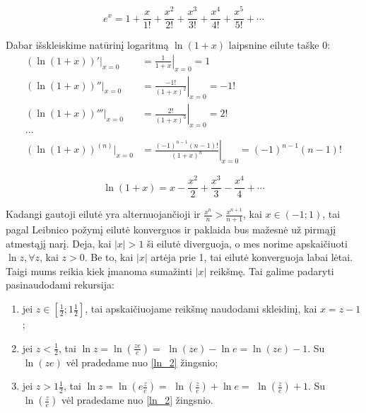 \begin{equation}
  e^{x} = 1 + \frac{x}{1!} + \frac{x^2}{2!} + \frac{x^3}{3!} +%
    \frac{x^4}{4!} + \frac{x^5}{5!} + \cdots
  \label{e_1}
\end{equation}


Dabar išskleiskime natūrinį logaritmą $\ln (1+x)$ laipsnine eilute 
taške $0$:
\begin{align*}
  (\ln (1 + x))'|_{x=0} &= \left. \frac{1}{1+x} \right|_{x=0} = 1 \\
  (\ln (1 + x))''|_{x=0} &= \left. \frac{-1!}{(1+x)^{2}} \right|_{x=0} %
    = -1! \\
  (\ln (1 + x))'''|_{x=0} &= \left. \frac{2!}{(1+x)^{3}} \right|_{x=0} %
    = 2! \\
  \cdots \\
  (\ln (1 + x))^{(n)}|_{x=0} &= %
    \left. \frac{(-1)^{n-1}(n-1)!}{(1+x)^{n}} \right|_{x=0} = %
    (-1)^{n-1}(n-1)!
\end{align*}

\begin{equation}
  \ln (1 + x) = x - \frac{x^2}{2} + \frac{x^3}{3} - \frac{x^4}{4} + \cdots
  \label{ln_1}
\end{equation}

Kadangi gautoji eilutė yra alternuojančioji ir 
$\frac{x^n}{n} > \frac{x^{n+1}}{n+1}$, kai $x \in (-1; 1)$, tai pagal 
Leibnico požymį eilutė konverguos ir paklaida bus mažesnė už pirmąjį
atmestąjį narį. Deja, kai $|x| > 1$ ši eilutė diverguoja, o mes
norime apskaičiuoti $\ln z, \forall z$, kai $z > 0$. Be to, 
kai $|x|$ artėja prie 1, tai eilutė konverguoja labai lėtai. Taigi
mums reikia kiek įmanoma sumažinti $|x|$ reikšmę. Tai galime padaryti
pasinaudodami rekursija:
\begin{enumerate}
  \item \label{ln_2} jei $z \in \left[ \frac{1}{2}; 1\frac{1}{2} \right]$, 
    tai apskaičiuojame reikšmę naudodami skleidinį, kai $x = z - 1$;
  \item jei $z < \frac{1}{2}$, tai 
    $\ln z = \ln \left( \frac{ze}{e} \right) =$
    $\ln (ze) - \ln e = \ln (ze) - 1$. Su $\ln (ze)$ vėl pradedame
    nuo \ref{ln_2} žingsnio;
  \item jei $z > 1\frac{1}{2}$, tai 
    $\ln z = \ln \left( e\frac{z}{e} \right) =$
    $\ln \left( \frac{z}{e} \right) + \ln e =$
    $\ln \left( \frac{z}{e} \right) + 1$. Su 
    $\ln \left( \frac{z}{e} \right)$ vėl pradedame nuo \ref{ln_2}
    žingsnio.
\end{enumerate}

